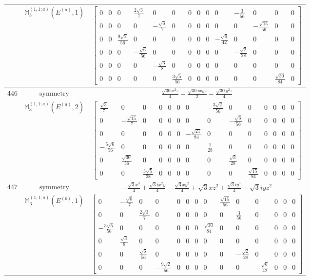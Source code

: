 \documentclass[fleqn,8pt,landscape]{jsarticle}
\begin{document}
\begin{longtable}{ccc}
$  $ & $ \mathbb{M}_{3}^{(1,1;a)}(E^{(a)},1) $ & $ \begin{bmatrix} 0 & 0 & 0 & \frac{2 \sqrt{3}}{7} & 0 & 0 & 0 & 0 & 0 & 0 & - \frac{3}{56} & 0 & 0 & 0 \\ 0 & 0 & 0 & 0 & - \frac{\sqrt{6}}{7} & 0 & 0 & 0 & 0 & 0 & 0 & - \frac{\sqrt{15}}{56} & 0 & 0 \\ 0 & 0 & \frac{9 \sqrt{2}}{56} & 0 & 0 & 0 & 0 & 0 & 0 & - \frac{\sqrt{6}}{42} & 0 & 0 & 0 & 0 \\ 0 & 0 & 0 & - \frac{\sqrt{6}}{56} & 0 & 0 & 0 & 0 & 0 & 0 & - \frac{\sqrt{2}}{28} & 0 & 0 & 0 \\ 0 & 0 & 0 & 0 & - \frac{\sqrt{3}}{8} & 0 & 0 & 0 & 0 & 0 & 0 & 0 & 0 & 0 \\ 0 & 0 & 0 & 0 & 0 & \frac{3 \sqrt{5}}{56} & 0 & 0 & 0 & 0 & 0 & 0 & \frac{\sqrt{30}}{84} & 0 \end{bmatrix} $ \\ \hline
$ 446 $ & $ \text{symmetry} $ & $ \frac{\sqrt{30} x^{2} z}{4} - \frac{\sqrt{30} i x y z}{2} - \frac{\sqrt{30} y^{2} z}{4} $ \\
$  $ & $ \mathbb{M}_{3}^{(1,1;a)}(E^{(a)},2) $ & $ \begin{bmatrix} \frac{\sqrt{3}}{7} & 0 & 0 & 0 & 0 & 0 & 0 & - \frac{3 \sqrt{2}}{56} & 0 & 0 & 0 & 0 & 0 & 0 \\ 0 & - \frac{\sqrt{15}}{7} & 0 & 0 & 0 & 0 & 0 & 0 & - \frac{\sqrt{6}}{56} & 0 & 0 & 0 & 0 & 0 \\ 0 & 0 & 0 & 0 & 0 & 0 & - \frac{\sqrt{21}}{84} & 0 & 0 & 0 & 0 & 0 & 0 & 0 \\ - \frac{5 \sqrt{6}}{56} & 0 & 0 & 0 & 0 & 0 & 0 & \frac{1}{28} & 0 & 0 & 0 & 0 & 0 & 0 \\ 0 & \frac{\sqrt{30}}{56} & 0 & 0 & 0 & 0 & 0 & 0 & \frac{\sqrt{3}}{28} & 0 & 0 & 0 & 0 & 0 \\ 0 & 0 & \frac{3 \sqrt{5}}{28} & 0 & 0 & 0 & 0 & 0 & 0 & \frac{\sqrt{15}}{84} & 0 & 0 & 0 & 0 \end{bmatrix} $ \\ \hline
$ 447 $ & $ \text{symmetry} $ & $ - \frac{\sqrt{3} x^{3}}{4} + \frac{\sqrt{3} i x^{2} y}{4} - \frac{\sqrt{3} x y^{2}}{4} + \sqrt{3} x z^{2} + \frac{\sqrt{3} i y^{3}}{4} - \sqrt{3} i y z^{2} $ \\
$  $ & $ \mathbb{M}_{3}^{(1,1;a)}(E^{(b)},1) $ & $ \begin{bmatrix} 0 & - \frac{\sqrt{6}}{7} & 0 & 0 & 0 & 0 & 0 & 0 & \frac{\sqrt{15}}{56} & 0 & 0 & 0 & 0 & 0 \\ 0 & 0 & \frac{2 \sqrt{3}}{7} & 0 & 0 & 0 & 0 & 0 & 0 & \frac{3}{56} & 0 & 0 & 0 & 0 \\ - \frac{3 \sqrt{5}}{56} & 0 & 0 & 0 & 0 & 0 & 0 & \frac{\sqrt{30}}{84} & 0 & 0 & 0 & 0 & 0 & 0 \\ 0 & \frac{\sqrt{3}}{8} & 0 & 0 & 0 & 0 & 0 & 0 & 0 & 0 & 0 & 0 & 0 & 0 \\ 0 & 0 & \frac{\sqrt{6}}{56} & 0 & 0 & 0 & 0 & 0 & 0 & - \frac{\sqrt{2}}{28} & 0 & 0 & 0 & 0 \\ 0 & 0 & 0 & - \frac{9 \sqrt{2}}{56} & 0 & 0 & 0 & 0 & 0 & 0 & - \frac{\sqrt{6}}{42} & 0 & 0 & 0 \end{bmatrix} $ \\ \hline

\end{longtable}
\end{document}

